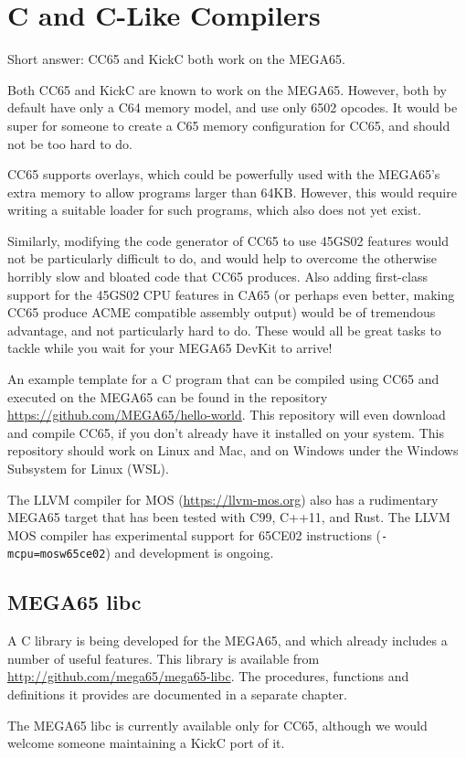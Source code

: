 \chapter{C and C-Like Compilers}

Short answer: CC65 and KickC both work on the MEGA65.

Both CC65 and KickC are known to work on the MEGA65.  However, both by
default have only a C64 memory model, and use only 6502 opcodes.
It would be super for someone to create a C65 memory configuration for
CC65, and should not be too hard to do.

CC65 supports overlays, which
could be powerfully used with the MEGA65's extra memory to allow
programs larger than 64KB.  However, this would require writing a
suitable loader for such programs, which also does not yet exist.

Similarly, modifying the code
generator of CC65 to use 45GS02 features would not be particularly
difficult to do, and would help to overcome the otherwise horribly
slow and bloated code that CC65 produces.  Also adding first-class
support for the 45GS02 CPU features in CA65 (or perhaps even better,
making CC65 produce ACME compatible assembly output) would be of
tremendous advantage, and not particularly hard to do.  These would
all be great tasks to tackle while you wait for your MEGA65 DevKit to
arrive!

An example template for a C program that can be compiled using CC65
and executed on the MEGA65 can be found in the repository
\url{https://github.com/MEGA65/hello-world}.  This repository will
even download and compile CC65, if you don't already have it installed
on your system.  This repository should work on Linux and Mac, and
on Windows under the Windows Subsystem for Linux (WSL).

The LLVM compiler for MOS (\url{https://llvm-mos.org}) also
has a rudimentary MEGA65 target that has been tested with C99, C++11, and Rust.
The LLVM MOS compiler has experimental support for 65CE02 instructions
(\texttt{-mcpu=mosw65ce02}) and development is ongoing.


\section{MEGA65 libc}

A C library is being developed for the MEGA65, and which already
includes a number of useful features. This library is available from
\url{http://github.com/mega65/mega65-libc}. The procedures,
functions and definitions it provides are documented in a separate
chapter.

The MEGA65 libc is currently available only for CC65, although we would
welcome someone maintaining a KickC port of it.

